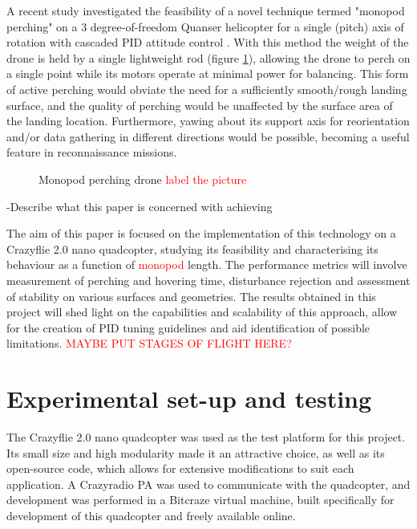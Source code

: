 \documentclass[12pt,a4paper]{article}
\begin{document}
A recent study investigated the feasibility of a novel technique termed "monopod perching" on a 3 degree-of-freedom Quanser helicopter for a single (pitch) axis of rotation with cascaded PID attitude control \cite{Hao}. With this method the weight of the drone is held by a single lightweight rod (figure \ref{fig1}), allowing the drone to perch on a single point while its motors operate at minimal power for balancing. This form of active perching would obviate the need for a sufficiently smooth/rough landing surface, and the quality of perching would be unaffected by the surface area of the landing location. Furthermore, yawing about its support axis for reorientation and/or data gathering in different directions would be possible, becoming a useful feature in reconnaissance missions.

\begin{figure}[h!]
\centering
  \caption{Monopod perching drone \textcolor{red}{label the picture}}
  \label{fig1}
\end{figure}


-Describe what this paper is concerned with achieving


The aim of this paper is focused on the implementation of this technology on a Crazyflie 2.0 nano quadcopter, studying its feasibility and characterising its behaviour as a function of \textcolor{red}{monopod} length. The performance metrics will involve measurement of perching and hovering time, disturbance rejection and assessment of stability on various surfaces and geometries. The results obtained in this project will shed light on the capabilities and scalability of this approach, allow for the creation of PID tuning guidelines and aid identification of possible limitations. \textcolor{red}{MAYBE PUT STAGES OF FLIGHT HERE?}




\section{Experimental set-up and testing}
The Crazyflie 2.0 nano quadcopter was used as the test platform for this project. Its small size and high modularity made it an attractive choice, as well as its open-source code, which allows for extensive modifications to suit each application. A Crazyradio PA was used to communicate with the quadcopter, and development was performed in a Bitcraze virtual machine, built specifically for development of this quadcopter and freely available online.
	
\end{document}
